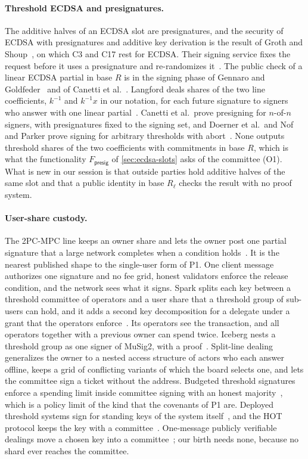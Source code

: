 \paragraph{Threshold ECDSA and presignatures.} The additive halves of an ECDSA slot are presignatures, and the security of ECDSA with presignatures and additive key derivation is the result of Groth and Shoup~\cite{GS21}, on which C3 and C17 rest for ECDSA. Their signing service fixes the request before it uses a presignature and re-randomizes it~\cite{GS22}. The public check of a linear ECDSA partial in base $R$ is in the signing phase of Gennaro and Goldfeder~\cite{GG20} and of Canetti et al.~\cite{CGGMP21}. Langford deals shares of the two line coefficients, $k^{-1}$ and $k^{-1}x$ in our notation, for each future signature to signers who answer with one linear partial~\cite{Lan95}. Canetti et al.\ prove presigning for $n$-of-$n$ signers, with presignatures fixed to the signing set, and Doerner et al.\ and Nof and Parker prove signing for arbitrary thresholds with abort~\cite{CGGMP21,DKLs23,TroutPP}. None outputs threshold shares of the two coefficients with commitments in base $R$, which is what the functionality $F_{\mathsf{presig}}$ of \cref{sec:ecdsa-slots} asks of the committee (O1). What is new in our session is that outside parties hold additive halves of the same slot and that a public identity in base $R_\ell$ checks the result with no proof system.

\paragraph{User-share custody.} The 2PC-MPC line keeps an owner share and lets the owner post one partial signature that a large network completes when a condition holds~\cite{TwoPCMPC,FMMSS25,IkaDocs}. It is the nearest published shape to the single-user form of P1. One client message authorizes one signature and no fee grid, honest validators enforce the release condition, and the network sees what it signs. Spark splits each key between a threshold committee of operators and a user share that a threshold group of sub-users can hold, and it adds a second key decomposition for a delegate under a grant that the operators enforce~\cite{Spark}. Its operators see the transaction, and all operators together with a previous owner can spend twice. Iceberg nests a threshold group as one signer of MuSig2, with a proof~\cite{Iceberg}. Split-line dealing generalizes the owner to a nested access structure of actors who each answer offline, keeps a grid of conflicting variants of which the board selects one, and lets the committee sign a ticket without the address. Budgeted threshold signatures enforce a spending limit inside committee signing with an honest majority~\cite{CZC26}, which is a policy limit of the kind that the covenants of P1 are. Deployed threshold systems sign for standing keys of the system itself~\cite{ckBTC,THORChain,tBTC}, and the HOT protocol keeps the key with a committee~\cite{HOT}. One-message publicly verifiable dealings move a chosen key into a committee~\cite{cgVSS,Groth21}; our birth needs none, because no shard ever reaches the committee.

